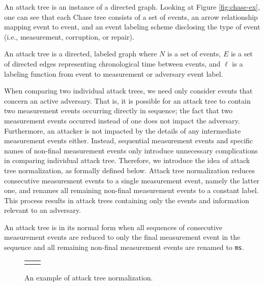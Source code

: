 \documentclass[runningheads]{llncs}
\theoremstyle{definition}
\begin{document}
An attack tree is an instance of a directed graph. Looking at Figure \ref{fig:chase-ex}, one can see that each Chase tree consists of a set of events, an arrow relationship mapping event to event, and an event labeling scheme disclosing the type of event (i.e., measurement, corruption, or repair).

\begin{definition}
    An attack tree is a directed, labeled graph where $N$ is a set of events, $E$ is a set of directed edges representing chronological time between events, and $\ell$ is a labeling function from event to measurement or adversary event label.
\end{definition}

When comparing two individual attack trees, we need only consider events that concern an active adversary. That is, it is possible for an attack tree to contain two measurement events occurring directly in sequence; the fact that two measurement events occurred instead of one does not impact the adversary. Furthermore, an attacker is not impacted by the details of any intermediate measurement events either. Instead, sequential measurement events and specific names of non-final measurement events only introduce unnecessary complications in comparing individual attack tree. Therefore, we introduce the idea of attack tree normalization, as formally defined below. Attack tree normalization reduces consecutive measurement events to a single measurement event, namely the latter one, and renames all remaining non-final measurement events to a constant label. This process results in attack trees containing only the events and information relevant to an adversary. 


\begin{definition}
    An attack tree is in its normal form when all sequences of consecutive measurement events are reduced to only the final measurement event in the sequence and all remaining non-final measurement events are renamed to \texttt{ms}. 
\end{definition}

\begin{figure}[htbp]
  \centering 
  \begin{tabular}{c c}
       &  
  \end{tabular}
  \captionsetup{justification=centering,margin=1cm}
  \caption[Example of attack tree normalization]{An example of attack tree normalization.}
  \label{fig:reduce-ex}
\end{figure}
\end{document}
